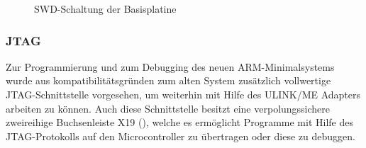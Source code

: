 \begin{figure}[H]
    \centering
    \qquad
    \qquad
    \caption[SWD-Schaltung der Basisplatine]{SWD-Schaltung der \gls{Basisplatine}}
    \label{fig:basisplatine-swd2}
\end{figure}

\subsubsection{JTAG}
Zur Programmierung und zum \gls{Debugging} des neuen \gls{ARM}-\gls{Minimalsystem}s wurde aus kompatibilitätsgründen zum alten System zusätzlich vollwertige JTAG-Schnittstelle vorgesehen, um weiterhin mit Hilfe des ULINK/ME Adapters arbeiten zu können. Auch diese Schnittstelle besitzt eine verpolungssichere zweireihige Buchsenleiste X19 (), welche es ermöglicht Programme mit Hilfe des JTAG-Protokolls auf den Microcontroller zu übertragen oder diese zu debuggen.

